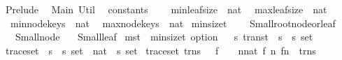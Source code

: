 %
\begin{isabellebody}%
%
%
\isadelimtheory
%
\endisadelimtheory
%
\isatagtheory
{}\isamarkupfalse%
\ Prelude\ \isanewline
{}\ Main\ Util\ \isanewline
{}%
\endisatagtheory
{\isafoldtheory}%
%
\isadelimtheory
\isanewline
%
\endisadelimtheory
\isanewline
\isanewline
\isanewline
\isanewline
\isanewline
\isanewline
\isanewline
{}\isamarkupfalse%
\ constants\ {\isacharequal}\ \isanewline
\ \ min{\isacharunderscore}leaf{\isacharunderscore}size\ {\isacharcolon}{\isacharcolon}\ nat\isanewline
\ \ max{\isacharunderscore}leaf{\isacharunderscore}size\ {\isacharcolon}{\isacharcolon}\ nat\isanewline
\ \ min{\isacharunderscore}node{\isacharunderscore}keys\ {\isacharcolon}{\isacharcolon}\ nat\isanewline
\ \ max{\isacharunderscore}node{\isacharunderscore}keys\ {\isacharcolon}{\isacharcolon}\ nat\isanewline
\isanewline
\isanewline
\isanewline
\isanewline
\isanewline
\isanewline
\isanewline
\isanewline
{}\isamarkupfalse%
\ min{\isacharunderscore}size{\isacharunderscore}t\ {\isacharequal}\ \isanewline
\ \ Small{\isacharunderscore}root{\isacharunderscore}node{\isacharunderscore}or{\isacharunderscore}leaf\isanewline
\ \ {\isacharbar}\ Small{\isacharunderscore}node\isanewline
\ \ {\isacharbar}\ Small{\isacharunderscore}leaf\isanewline
\isanewline
{}\isamarkupfalse%
\ ms{\isacharunderscore}t\ {\isacharequal}\ {\isachardoublequoteopen}min{\isacharunderscore}size{\isacharunderscore}t\ option{\isachardoublequoteclose}\isanewline
\isanewline
\ \isanewline
\isanewline
\isanewline
\isanewline
\isanewline
{}\isamarkupfalse%
\ {\isacharprime}s\ trans{\isacharunderscore}t\ {\isacharequal}\ {\isachardoublequoteopen}{\isacharparenleft}{\isacharprime}s\ {\isacharasterisk}\ {\isacharprime}s{\isacharparenright}\ set{\isachardoublequoteclose}\isanewline
\isanewline
{}\isamarkupfalse%
\ trace{\isacharunderscore}set\ {\isacharcolon}{\isacharcolon}\ {\isachardoublequoteopen}{\isacharparenleft}{\isacharprime}s\ {\isacharasterisk}\ {\isacharprime}s{\isacharparenright}\ set\ {\isasymRightarrow}\ {\isacharparenleft}nat\ {\isasymRightarrow}\ {\isacharprime}s{\isacharparenright}\ set{\isachardoublequoteclose}\ \isanewline
{\isachardoublequoteopen}trace{\isacharunderscore}set\ trns\ {\isacharequal}\ {\isacharbraceleft}\ f\ {\isachardot}\ \ {\isacharparenleft}{\isacharbang}\ {\isacharparenleft}n{\isacharcolon}{\isacharcolon}nat{\isacharparenright}{\isachardot}\ {\isacharparenleft}f\ n{\isacharcomma}\ f{\isacharparenleft}n{\isacharplus}{}{\isacharparenright}{\isacharparenright}\ {\isacharcolon}\ trns{\isacharparenright}\ {\isacharbraceright}{\isachardoublequoteclose}\isanewline

\end{isabellebody}
